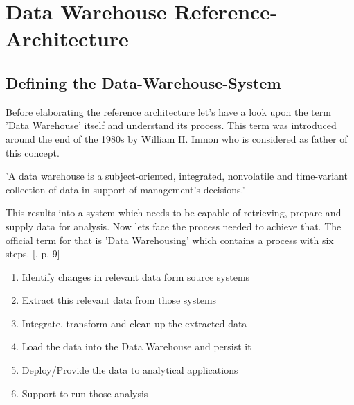 \section{Data Warehouse Reference-Architecture}
\label{sec:referenceArchitecture}

\subsection{Defining the Data-Warehouse-System}
Before elaborating the reference architecture let's have a look upon the term 'Data Warehouse' itself and understand its process.\newline
This term was introduced around the end of the 1980s by William H. Inmon who is considered as father of this concept.
\begin{definition}
'A data warehouse is a subject-oriented, integrated, nonvolatile and time-variant collection of data in support of management's decisions.'\cite{buildingTheDWS}
\end{definition}
This results into a system which needs to be capable of retrieving, prepare and supply data for analysis.\newline
Now lets face the process needed to achieve that. The official term for that is 'Data Warehousing' which contains a process with six steps. [\cite{dwsRefArchitecture}, p. 9]
\begin{enumerate}
    \item Identify changes in relevant data form source systems
    \item Extract this relevant data from those systems
    \item Integrate, transform and clean up the extracted data
    \item Load the data into the Data Warehouse and persist it
    \item Deploy/Provide the data to analytical applications 
    \item Support to run those analysis
\end{enumerate}

